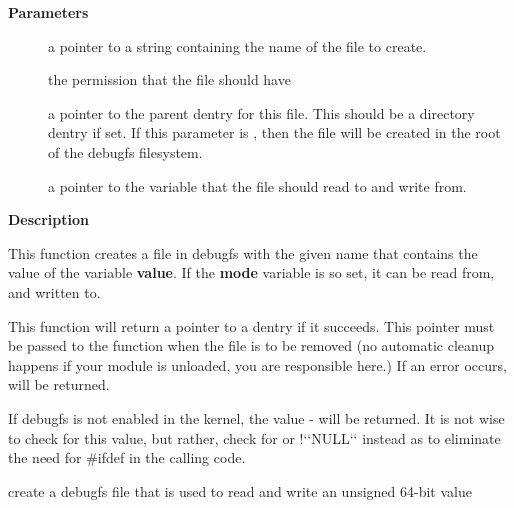 \documentclass[a4paper,8pt,english]{sphinxmanual}
\begin{document}
\textbf{Parameters}
\begin{description}
\item[{}] \leavevmode
a pointer to a string containing the name of the file to create.

\item[{}] \leavevmode
the permission that the file should have

\item[{}] \leavevmode
a pointer to the parent dentry for this file.  This should be a
directory dentry if set.  If this parameter is , then the
file will be created in the root of the debugfs filesystem.

\item[{}] \leavevmode
a pointer to the variable that the file should read to and write
from.

\end{description}

\textbf{Description}

This function creates a file in debugfs with the given name that
contains the value of the variable \textbf{value}.  If the \textbf{mode} variable is so
set, it can be read from, and written to.

This function will return a pointer to a dentry if it succeeds.  This
pointer must be passed to the {\hyperref[filesystems/index:c.debugfs_remove]{\emph{}}} function when the file is
to be removed (no automatic cleanup happens if your module is unloaded,
you are responsible here.)  If an error occurs,  will be returned.

If debugfs is not enabled in the kernel, the value - will be
returned.  It is not wise to check for this value, but rather, check for
 or !{}`{}`NULL{}`{}` instead as to eliminate the need for \#ifdef in the calling
code.

\begin{fulllineitems}
\label{filesystems/index:c.debugfs_create_u64}
create a debugfs file that is used to read and write an unsigned 64-bit value

\end{fulllineitems}
\end{document}
